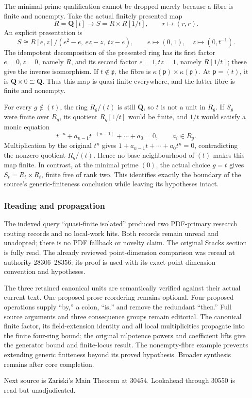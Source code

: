 The minimal-prime qualification cannot be dropped merely because a fibre is finite and nonempty. Take the actual finitely presented map \[
 R=\mathbf Q[t]\longrightarrow
 S=R\times R[1/t],\qquad r\longmapsto(r,r).
\] An explicit presentation is \[
 S\cong R[e,z]/(e^2-e,\ ez-z,\ tz-e),
 \qquad e\longmapsto(0,1),\quad z\longmapsto(0,t^{-1}).
\] The idempotent decomposition of the presented ring has its first factor \(e=0,z=0\), namely \(R\), and its second factor \(e=1,tz=1\), namely \(R[1/t]\); these give the inverse isomorphism. If \(t\notin\mathfrak p\), the fibre is \(\kappa(\mathfrak p)\times\kappa(\mathfrak p)\). At \(\mathfrak p=(t)\), it is \(\mathbf Q\times0\cong\mathbf Q\). Thus this map is quasi-finite everywhere, and the latter fibre is finite and nonempty.

For every \(g\notin(t)\), the ring \(R_g/(t)\) is still \(\mathbf Q\), so \(t\) is not a unit in \(R_g\). If \(S_g\) were finite over \(R_g\), its quotient \(R_g[1/t]\) would be finite, and \(1/t\) would satisfy a monic equation \[
 t^{-n}+a_{n-1}t^{-(n-1)}+\cdots+a_0=0,\qquad a_i\in R_g.
\] Multiplication by the original \(t^n\) gives \(1+a_{n-1}t+\cdots+a_0t^n=0\), contradicting the nonzero quotient \(R_g/(t)\). Hence no base neighbourhood of \((t)\) makes this map finite. In contrast, at the minimal prime \((0)\), the actual choice \(g=t\) gives \(S_t=R_t\times R_t\), finite free of rank two. This identifies exactly the boundary of the source's generic-finiteness conclusion while leaving its hypotheses intact.

\subsubsection{Reading and propagation}\label{algebra-proof-031-reading-and-propagation}

The indexed query ``quasi-finite isolated'' produced two PDF-primary research routing records and no local-work hits. Both records remain unread and unadopted; there is no PDF fallback or novelty claim. The original Stacks section is fully read. The already reviewed point-dimension comparison was reread at authority 28306--28356; its proof is used with its exact point-dimension convention and hypotheses.

The three retained canonical units are semantically verified against their actual current text. One proposed prose reordering remains optional. Four proposed operations supply ``by,'' a colon, ``is,'' and remove the redundant ``then.'' Full source arguments and three consequence groups remain editorial. The canonical finite factor, its field-extension identity and all local multiplicities propagate into the finite four-ring bound; the original nilpotence powers and coefficient lifts give the generator bound and finite-locus result. The nonempty-fibre example prevents extending generic finiteness beyond its proved hypothesis. Broader synthesis remains after core completion.

Next source is Zariski's Main Theorem at 30454. Lookahead through 30550 is read but unadjudicated.
